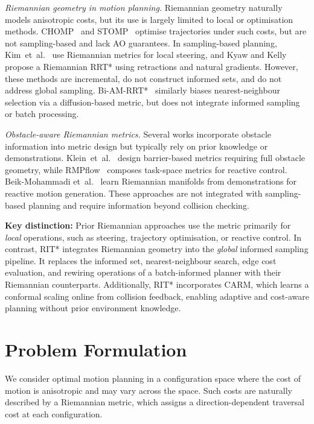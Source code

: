 \documentclass[journal]{IEEEtran}
\newcommand{\rev}[1]{#1}%
\begin{document}
\textit{Riemannian geometry in motion planning.}
Riemannian geometry naturally models anisotropic costs, but its use is
largely limited to local or optimisation methods. CHOMP~\cite{Ratliff2009}
and STOMP~\cite{Kalakrishnan2011stomp} optimise trajectories under such costs, but
are not sampling-based and lack AO guarantees. In sampling-based
planning, Kim~et~al.~\cite{Kim2016} use Riemannian metrics for local
steering, and Kyaw and Kelly~\cite{Kyaw2026} propose a Riemannian RRT*
using retractions and natural gradients. However, these methods are
incremental, do not construct informed sets, and do not address global
sampling. Bi-AM-RRT*~\cite{Zhang2023biamrrt} similarly biases
nearest-neighbour selection via a diffusion-based metric, but does not
integrate informed sampling or batch processing.

\textit{Obstacle-aware Riemannian metrics.}
Several works incorporate obstacle information into metric design but
typically rely on prior knowledge or demonstrations.
Klein~et~al.~\cite{Klein2023} design barrier-based metrics requiring full
obstacle geometry, while RMPflow~\cite{Cheng2018rmpflow} composes
task-space metrics for reactive control. Beik-Mohammadi
et~al.~\cite{BeikMohammadi2023} learn Riemannian manifolds from
demonstrations for reactive motion generation. These approaches are not
integrated with sampling-based planning and require information beyond
collision checking.

\textbf{Key distinction:}
Prior Riemannian approaches use the metric primarily for \emph{local} operations, such as steering, trajectory optimisation, or reactive control. In contrast, RIT* integrates Riemannian geometry into the
\emph{global} informed sampling pipeline. It replaces the informed set, nearest-neighbour search, edge cost evaluation, and rewiring operations of
a batch-informed planner with their Riemannian counterparts. Additionally, RIT* incorporates CARM, which \rev{learns a conformal scaling online} from collision feedback, enabling adaptive and cost-aware planning
without prior environment knowledge.
\section{Problem Formulation}\label{sec:problem}

We consider optimal motion planning in a configuration space where the
cost of motion is anisotropic and may vary across the space. Such costs
are naturally described by a Riemannian metric, which assigns a
direction-dependent traversal cost at each configuration.
\end{document}
